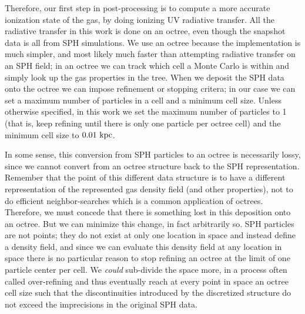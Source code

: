 Therefore, our first step in post-processing is to compute a more accurate ionization state of the gas, by doing ionizing UV radiative transfer.
All the radiative transfer in this work is done on an octree, even though the snapshot data is all from SPH simulations.
We use an octree because the implementation is much simpler, and most likely much faster than attempting radiative transfer on an SPH field; in an octree we can track which cell a Monte Carlo is within and simply look up the gas properties in the tree.
When we deposit the SPH data onto the octree we can impose refinement or stopping critera; in our case we can set a maximum number of particles in a cell and a minimum cell size.
Unless otherwise specified, in this work we set the maximum number of particles to 1 (that is, keep refining until there is only one particle per octree cell) and the minimum cell size to $0.01\ \rm{kpc}$.

In some sense, this conversion from SPH particles to an octree is necessarily lossy, since we cannot convert from an octree structure back to the SPH representation.
Remember that the point of this different data structure is to have a different representation of the represented gas density field (and other properties), not to do efficient neighbor-searches which is a common application of octrees.
Therefore, we must concede that there is something lost in this deposition onto an octree.
But we can minimize this change, in fact arbitrarily so.
SPH particles are not points; they do not exist at only one location in space and instead define a density field, and since we can evaluate this density field at any location in space there is no particular reason to stop refining an octree at the limit of one particle center per cell.
We \emph{could} sub-divide the space more, in a process often called over-refining and thus eventually reach at every point in space an octree cell size such that the discontinuities introduced by the discretized structure do not exceed the imprecisions in the original SPH data.

